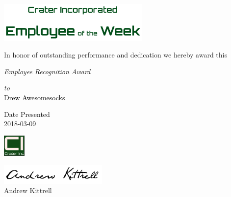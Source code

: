 \documentclass[landscape]{article}
\begin{document}
\centering
\begin{minipage}{.33\textwidth}
{\centering

\begin{minipage}{.9\textwidth}
\centering
\includegraphics[height=2.0cm] {_employee-of-the-week.png}
\end{minipage}


\vspace{2mm}
\textcolor{green!10!black!90}{
\tiny In honor of outstanding performance and dedication we hereby award this}

\smallskip

\textcolor{red!30!black!90}
{\textit{Employee Recognition Award}}

\textcolor{red!30!black!90}
{\textit{to}}\\

\vspace{1mm}
\textcolor{black} {
\large Drew Awesomesocks }

\vspace{2.5mm}


\begin{multicols}{3}
\vspace{1cm}
\textcolor{black}{
\tiny Date Presented }\\
\tiny 2018-03-09

\columnbreak

\includegraphics[height=1.1cm]{ciLogo.jpg}

\columnbreak

\includegraphics[height=.5cm] {_Kittrell.png}\\
\tiny Andrew Kittrell
\end{multicols}

\vspace{1mm}
}
\end{minipage}
\end{document}
